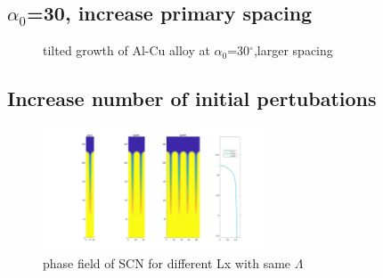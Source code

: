 \documentclass[a4paper,12pt]{article}
\begin{document}
   
   
   
\subsection{$\alpha_0$=30, increase primary spacing}

\begin{figure}[!ht]
     \hfill
    
     \caption{tilted growth of Al-Cu alloy at $\alpha_0$=30$^\circ$,larger spacing}
     \label{fig:Ech}
   \end{figure}
   
\subsection{Increase number of initial pertubations}   
\begin{figure}
 \centering
  \includegraphics[width=0.6\textwidth]{./figures/nx20t2_4Lx_conv.png}
  \caption{phase field of SCN for different Lx with same $\Lambda$}
  \label{fig:Lx_conv}
\end{figure}
\end{document}
